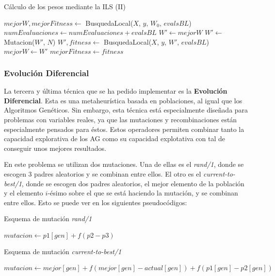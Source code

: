 \documentclass[11pt,a4paper]{article}
\begin{document}
\begin{algorithm}[H]
\caption{Cálculo de los pesos mediante la ILS (II)}
\begin{algorithmic}
\State $mejorW, mejorFitness \gets$ BusquedaLocal($X$, $y$, $W_0$, $evalsBL$)
\State $numEvaluaciones \gets numEvaluaciones + evalsBL$
	\State $W' \gets mejorW$
	\State $W' \gets $ Mutacion($W'$, $N$)
	\State $W', fitness \gets$ BusquedaLocal($X$, $y$, $W'$, $evalsBL$)
		\State $mejorW \gets W'$
		\State $mejorFitness \gets fitness$
	\EndIf
\EndWhile
\State {}
\EndFunction
\end{algorithmic}
\end{algorithm}

\newpage

\subsubsection{Evolución Diferencial}

La tercera y última técnica que se ha pedido implementar es la \textbf{Evolución Diferencial}. Esta es una metaheurística basada
en poblaciones, al igual que los Algoritmos Genéticos. Sin embargo, esta técnica está especialmente diseñada para problemas
con variables reales, ya que las mutaciones y recombinaciones están especialmente pensados para éstos. Estos operadores permiten
combinar tanto la capacidad explorativa de los AG como su capacidad explotativa con tal de conseguir unos mejores resultados.

En este problema se utilizan dos mutaciones. Una de ellas es el \textit{rand/1}, donde se escogen 3 padres aleatorios y se
combinan entre ellos. El otro es el \textit{current-to-best/1}, donde se escogen dos padres aleatorios, el mejor elemento
de la población y el elemento $i$-ésimo sobre el que se está haciendo la mutación, y se combinan entre ellos. Esto se puede ver
en los siguientes pseudocódigos:

\begin{algorithm}[H]
\caption{Esquema de mutación \textit{rand/1}}
\begin{algorithmic}[1]
\State $mutacion \gets p1[gen] + f (p2 - p3)$
\State {}
\EndFunction
\end{algorithmic}
\end{algorithm}

\begin{algorithm}[H]
\caption{Esquema de mutación \textit{current-to-best/1}}
\begin{algorithmic}[1]
\State $mutacion \gets mejor[gen] + f (mejor[gen] - actual[gen]) + f (p1[gen] - p2[gen])$
\State {}
\EndFunction
\end{algorithmic}
\end{algorithm}
\end{document}
